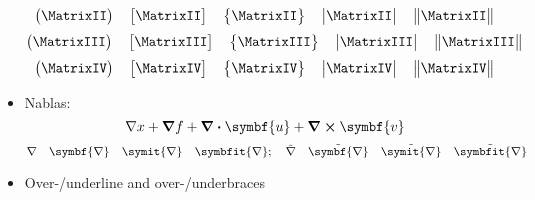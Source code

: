 \documentclass { article }
\begin{document}
\begin{itemize}
        \[
          \begin{pmatrix} \MatrixII  \end{pmatrix} \quad
          \begin{bmatrix} \MatrixII  \end{bmatrix} \quad
          \begin{Bmatrix} \MatrixII  \end{Bmatrix} \quad
          \begin{vmatrix} \MatrixII  \end{vmatrix} \quad
          \begin{Vmatrix} \MatrixII  \end{Vmatrix}
        \]
        \[
          \begin{pmatrix} \MatrixIII \end{pmatrix} \quad
          \begin{bmatrix} \MatrixIII \end{bmatrix} \quad
          \begin{Bmatrix} \MatrixIII \end{Bmatrix} \quad
          \begin{vmatrix} \MatrixIII \end{vmatrix} \quad
          \begin{Vmatrix} \MatrixIII \end{Vmatrix}
        \]
        \[
          \begin{pmatrix} \MatrixIV  \end{pmatrix} \quad
          \begin{bmatrix} \MatrixIV  \end{bmatrix} \quad
          \begin{Bmatrix} \MatrixIV  \end{Bmatrix} \quad
          \begin{vmatrix} \MatrixIV  \end{vmatrix} \quad
          \begin{Vmatrix} \MatrixIV  \end{Vmatrix}
        \]
  \item Nablas:
        \[ \nabla x + \grad{f} + \divergence{\symbf{u}} + \curl{\symbf{v}} \]
        \[
          \nabla                 \quad \symbf{\nabla}           \quad
          \symit{\nabla}         \quad \symbfit{\nabla};        \quad
          \tilde{\nabla}         \quad \tilde{\symbf{\nabla}}   \quad
          \tilde{\symit{\nabla}} \quad \tilde{\symbfit{\nabla}}
        \]
  \item Over-/underline and over-/underbraces

\end{itemize}
\end{document}
